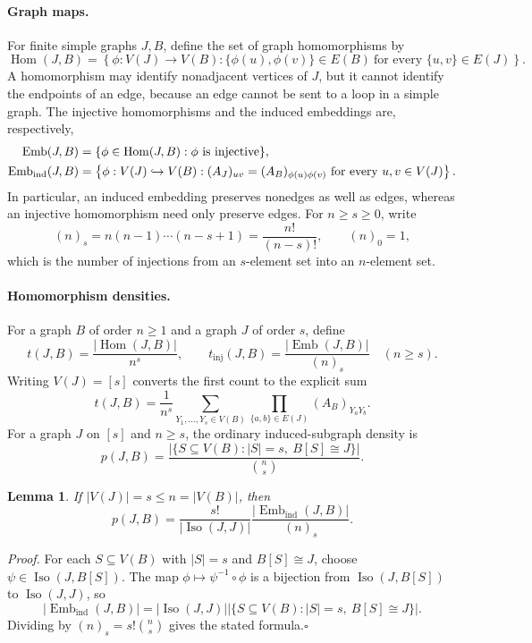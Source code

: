 \documentclass[11pt]{article}
\newtheorem{lemma}{Lemma}
\begin{document}
\paragraph{Graph maps.}
For finite simple graphs $J,B$, define the set of graph homomorphisms by
\begin{equation}\label{eq:hom-set}
\operatorname{Hom}(J,B)=
\left\{\phi:V(J)\longrightarrow V(B):
\{\phi(u),\phi(v)\}\in E(B)
\ \text{for every }\{u,v\}\in E(J)\right\}.
\end{equation}
A homomorphism may identify nonadjacent vertices of $J$, but it cannot identify the endpoints of an edge, because an edge cannot be sent to a loop in a simple graph.
The injective homomorphisms and the induced embeddings are, respectively,
\begin{align}
\operatorname{Emb}(J,B)
&=\{\phi\in\operatorname{Hom}(J,B):\phi\text{ is injective}\},\notag\\
\operatorname{Emb}_{\mathrm{ind}}(J,B)
&=\left\{\phi:V(J)\hookrightarrow V(B):
(A_J)_{uv}=(A_B)_{\phi(u)\phi(v)}
\ \text{for every }u,v\in V(J)\right\}.
\label{eq:embedding-sets}
\end{align}
In particular, an induced embedding preserves nonedges as well as edges, whereas an injective homomorphism need only preserve edges.
For $n\geq s\geq0$, write
\[
(n)_s=n(n-1)\cdots(n-s+1)=\frac{n!}{(n-s)!},
\qquad (n)_0=1,
\]
which is the number of injections from an $s$-element set into an $n$-element set.
\paragraph{Homomorphism densities.}
For a graph $B$ of order $n\geq1$ and a graph $J$ of order $s$, define
\begin{equation}\label{eq:hom-density}
t(J,B)=\frac{|\operatorname{Hom}(J,B)|}{n^s},
\qquad
t_{\mathrm{inj}}(J,B)=\frac{|\operatorname{Emb}(J,B)|}{(n)_s}
\quad(n\geq s).
\end{equation}
Writing $V(J)=[s]$ converts the first count to the explicit sum
\begin{equation}\label{eq:hom-product}
t(J,B)=\frac1{n^s}\sum_{Y_1,\ldots,Y_s\in V(B)}
\prod_{\{a,b\}\in E(J)}(A_B)_{Y_aY_b}.
\end{equation}
For a graph $J$ on $[s]$ and $n\geq s$, the ordinary induced-subgraph density is
\begin{equation}\label{eq:induced-density}
p(J,B)=
\frac{\left|\{S\subseteq V(B):|S|=s,\ B[S]\cong J\}\right|}
{\binom ns}.
\end{equation}
\begin{lemma}\label{lem:induced-normalization}
If $|V(J)|=s\leq n=|V(B)|$, then
\[
p(J,B)=
\frac{s!}{|\operatorname{Iso}(J,J)|}
\frac{|\operatorname{Emb}_{\mathrm{ind}}(J,B)|}{(n)_s}.
\]
\end{lemma}
\noindent\emph{Proof.}
For each $S\subseteq V(B)$ with $|S|=s$ and $B[S]\cong J$, choose
$\psi\in\operatorname{Iso}(J,B[S])$.
The map $\phi\mapsto\psi^{-1}\circ\phi$ is a bijection from
$\operatorname{Iso}(J,B[S])$ to $\operatorname{Iso}(J,J)$, so
\[
|\operatorname{Emb}_{\mathrm{ind}}(J,B)|
=|\operatorname{Iso}(J,J)|
\left|\{S\subseteq V(B):|S|=s,\ B[S]\cong J\}\right|.
\]
Dividing by $(n)_s=s!\binom ns$ gives the stated formula.\hfill$\square$
\end{document}
